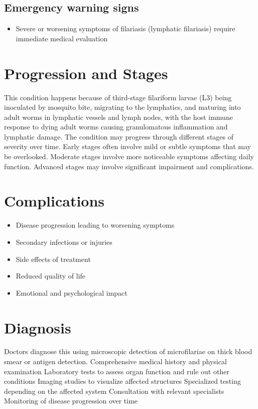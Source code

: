 \subsection{Emergency warning signs}
\begin{itemize}[noitemsep]
  \item Severe or worsening symptoms of filariasis (lymphatic filariasis) require immediate medical evaluation
\end{itemize}
\section{Progression and Stages}
This condition happens because of third-stage filariform larvae (L3) being inoculated by mosquito bite, migrating to the lymphatics, and maturing into adult worms in lymphatic vessels and lymph nodes, with the host immune response to dying adult worms causing granulomatous inflammation and lymphatic damage. The condition may progress through different stages of severity over time. Early stages often involve mild or subtle symptoms that may be overlooked. Moderate stages involve more noticeable symptoms affecting daily function. Advanced stages may involve significant impairment and complications.
\section{Complications}
\begin{itemize}[noitemsep]
  \item Disease progression leading to worsening symptoms
  \item Secondary infections or injuries
  \item Side effects of treatment
  \item Reduced quality of life
  \item Emotional and psychological impact
\end{itemize}
\section{Diagnosis}
Doctors diagnose this using microscopic detection of microfilariae on thick blood smear or antigen detection. Comprehensive medical history and physical examination Laboratory tests to assess organ function and rule out other conditions Imaging studies to visualize affected structures Specialized testing depending on the affected system Consultation with relevant specialists Monitoring of disease progression over time

